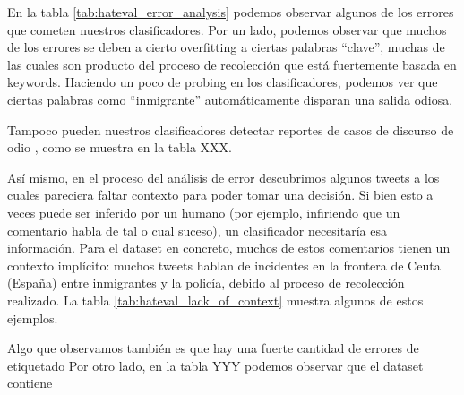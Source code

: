 En la tabla \ref{tab:hateval_error_analysis} podemos observar algunos de los errores que cometen nuestros clasificadores. Por un lado, podemos observar que muchos de los errores se deben a cierto overfitting a ciertas palabras ``clave'', muchas de las cuales son producto del proceso de recolección que está fuertemente basada en keywords. Haciendo un poco de probing en los clasificadores, podemos ver que ciertas palabras como ``inmigrante'' automáticamente disparan una salida odiosa.

Tampoco pueden nuestros clasificadores detectar reportes de casos de discurso de odio , como se muestra en la tabla XXX.

Así mismo, en el proceso del análisis de error descubrimos algunos tweets a los cuales pareciera faltar contexto para poder tomar una decisión. Si bien esto a veces puede ser inferido por un humano (por ejemplo, infiriendo que un comentario habla de tal o cual suceso), un clasificador necesitaría esa información. Para el dataset en concreto, muchos de estos comentarios tienen un contexto implícito: muchos tweets hablan de incidentes en la frontera de Ceuta (España) entre inmigrantes y la policía, debido al proceso de recolección realizado. La tabla \ref{tab:hateval_lack_of_context} muestra algunos de estos ejemplos.

Algo que observamos también es que hay una fuerte cantidad de errores de etiquetado
Por otro lado, en la tabla YYY podemos observar que el dataset contiene



